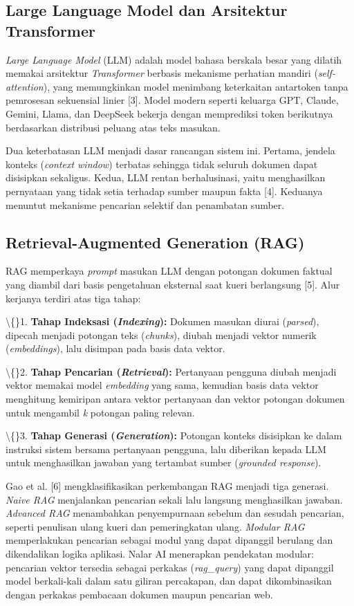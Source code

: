 \documentclass[12pt,a4paper]{article}
\begin{document}
\subsection*{Large Language Model dan Arsitektur Transformer}
\textit{Large Language Model} (LLM) adalah model bahasa berskala besar yang dilatih memakai arsitektur \textit{Transformer} berbasis mekanisme perhatian mandiri (\textit{self-attention}), yang memungkinkan model menimbang keterkaitan antartoken tanpa pemrosesan sekuensial linier {[}3{]}. Model modern seperti keluarga GPT, Claude, Gemini, Llama, dan DeepSeek bekerja dengan memprediksi token berikutnya berdasarkan distribusi peluang atas teks masukan.

Dua keterbatasan LLM menjadi dasar rancangan sistem ini. Pertama, jendela konteks (\textit{context window}) terbatas sehingga tidak seluruh dokumen dapat disisipkan sekaligus. Kedua, LLM rentan berhalusinasi, yaitu menghasilkan pernyataan yang tidak setia terhadap sumber maupun fakta {[}4{]}. Keduanya menuntut mekanisme pencarian selektif dan penambatan sumber.

\subsection*{Retrieval-Augmented Generation (RAG)}
RAG memperkaya \textit{prompt} masukan LLM dengan potongan dokumen faktual yang diambil dari basis pengetahuan eksternal saat kueri berlangsung {[}5{]}. Alur kerjanya terdiri atas tiga tahap:

\textbackslash\{\}1. \textbf{Tahap Indeksasi (}\textbf{\textit{Indexing}\textbf{}):} Dokumen masukan diurai (\textit{parsed}), dipecah menjadi potongan teks (\textit{chunks}), diubah menjadi vektor numerik (\textit{embeddings}), lalu disimpan pada basis data vektor.

\textbackslash\{\}2. \textbf{Tahap Pencarian (}\textbf{\textit{Retrieval}\textbf{}):} Pertanyaan pengguna diubah menjadi vektor memakai model \textit{embedding} yang sama, kemudian basis data vektor menghitung kemiripan antara vektor pertanyaan dan vektor potongan dokumen untuk mengambil \textit{k} potongan paling relevan.

\textbackslash\{\}3. \textbf{Tahap Generasi (}\textbf{\textit{Generation}\textbf{}):} Potongan konteks disisipkan ke dalam instruksi sistem bersama pertanyaan pengguna, lalu diberikan kepada LLM untuk menghasilkan jawaban yang tertambat sumber (\textit{grounded response}).

Gao et al. {[}6{]} mengklasifikasikan perkembangan RAG menjadi tiga generasi. \textit{Naive RAG} menjalankan pencarian sekali lalu langsung menghasilkan jawaban. \textit{Advanced RAG} menambahkan penyempurnaan sebelum dan sesudah pencarian, seperti penulisan ulang kueri dan pemeringkatan ulang. \textit{Modular RAG} memperlakukan pencarian sebagai modul yang dapat dipanggil berulang dan dikendalikan logika aplikasi. Nalar AI menerapkan pendekatan modular: pencarian vektor tersedia sebagai perkakas (\textit{rag\_query}) yang dapat dipanggil model berkali-kali dalam satu giliran percakapan, dan dapat dikombinasikan dengan perkakas pembacaan dokumen maupun pencarian web.
\end{document}
